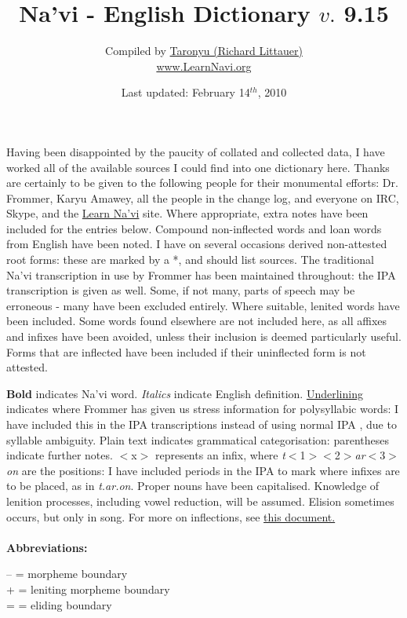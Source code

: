 \documentclass[11pt]{article}
\title{{\sc Na'vi - English Dictionary} $v.$ 9.15}
\author{Compiled by \href{mailto:richard@learnnavi.org}{Taronyu (Richard Littauer)}\\ \href{www.LearnNavi.org}{www.LearnNavi.org}}
\date{Last updated: February 14$^{th}$, 2010}
\begin{document}
\newpage
\singlespacing
\maketitle
Having been disappointed by the paucity of collated and collected data, I have worked all of the available sources I could find into one dictionary here. Thanks are certainly to be given to the following people for their monumental efforts: Dr. Frommer, Karyu Amawey, all the people in the change log, and everyone on IRC, Skype, and the \href{http://forum.learnnavi.org}{Learn Na'vi} site.
Where appropriate, extra notes have been included for the entries below. Compound non-inflected words and loan words from English have been noted. I have on several occasions derived non-attested root forms: these are marked by a *, and should list sources. The traditional Na'vi transcription in use by Frommer has been maintained throughout: the IPA transcription is given as well. Some, if not many, parts of speech may be erroneous - many have been excluded entirely. Where suitable, lenited words have been included. Some words found elsewhere are not included here, as all affixes and infixes have been avoided, unless their inclusion is deemed particularly useful.  Forms that are inflected have been included if their uninflected form is not attested.\par \textbf{Bold} indicates Na'vi word. {\sl Italics} indicate English definition. \uline{Underlining} indicates where Frommer has given us stress information for polysyllabic words: I have included this in the IPA transcriptions instead of using normal IPA \textprimstress , due to syllable ambiguity. Plain text indicates grammatical categorisation: parentheses indicate further notes. $<$x$>$ represents an infix, where {\it t}$<$1$>$$<$2$>${\it ar}$<$3$>${\it on} are the positions: I have included periods in the IPA to mark where infixes are to be placed, as in {\it t.ar.on}. Proper nouns have been capitalised. Knowledge of lenition processes, including vowel reduction, will be assumed. Elision sometimes occurs, but only in song. For more on inflections, see \href{http://www.talknavi.com/taronyu/Inflections.pdf}{this document.}\\ \\
{\bf Abbreviations:}
\begin{multicols}{2}{\noindent
-- = morpheme boundary\\
+ = leniting morpheme boundary\\
= = eliding boundary\\
}
\end{multicols}$$
\end{document}
